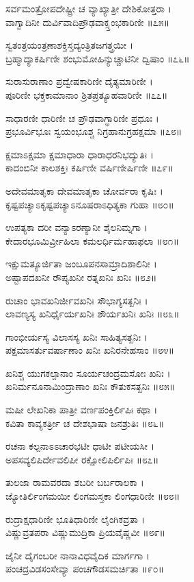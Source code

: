 ಸರ್ವಮಂತ್ರೋಪದೇಷ್ಟ್ರೀ ಚ ವ್ಯಾಖ್ಯಾತ್ರೀ ದೇಶಿಕೋತ್ತರಾ ।\\
ವಾಗ್ವಾದಿನೀ ದುರ್ವಿವಾದಿಪ್ರೌಢವಾಕ್ಸ್ತಂಭಕಾರಿಣೀ ॥೭೫॥

ಸ್ವತಂತ್ರಯಂತ್ರಣಾಶಕ್ತಿಸ್ತದ್ಯಂತ್ರಿತಜಗತ್ತ್ರಯೀ ।\\
ಬ್ರಹ್ಮಾದ್ಯಾಕರ್ಷಿಣೀ ಶಂಭುಮೋಹಿನ್ಯುಚ್ಚಾಟಿನೀ ದ್ವಿಷಾಂ ॥೭೬॥

ಸುರಾಸುರಾಣಾಂ ಪ್ರದ್ವೇಷಕಾರಿಣೀ ದೈತ್ಯಮಾರಿಣೀ ।\\
ಪೂರಿಣೀ ಭಕ್ತಕಾಮಾನಾಂ ಶ್ರಿತಪ್ರತ್ಯೂಹವಾರಿಣೀ ॥೭೭॥

ಸಾಧಾರಣೀ ಧಾರಿಣೀ ಚ ಪ್ರೌಢವಾಗ್ಧಾರಿಣೀ ಪ್ರಧೂಃ ।\\
ಪ್ರಭೂರ್ವಿಭೂಃ ಸ್ವಯಂಭೂಶ್ಚ ನಿಗ್ರಹಾನುಗ್ರಹಕ್ಷಮಾ ॥೭೮॥

ಕ್ಷಮಾಽಕ್ಷಮಾ ಕ್ಷಮಾಧಾರಾ ಧಾರಾಧರನಿಭದ್ಯುತಿಃ ।\\
ಕಾದಂಬಿನೀ ಕಾಲಶಕ್ತಿಃ ಕರ್ಷಿಣೀ ವರ್ಷಿಣೀರ್ಷಿಣೀ ॥೭೯॥

ಅದೇವಮಾತೃಕಾ ದೇವಮಾತೃಕಾ ಚೋರ್ವರಾ ಕೃಷಿಃ ।\\
ಕೃಷ್ಟಪಚ್ಯಾಽಕೃಷ್ಟಪಚ್ಯಾಽನೂಷರಾಽಧಿತ್ಯಕಾ ಗುಹಾ ॥೮೦॥

ಉಪತ್ಯಕಾ ದರೀ ವನ್ಯಾಽರಣ್ಯಾನೀ ಶೈಲನಿಮ್ನಗಾ ।\\
ಕೇದಾರಭೂಮಿರ್ವ್ರೀಹಿಲಾ ಕಮಲರ್ಧಿರ್ಮಹಾಫಲಾ ॥೮೧॥

ಇಕ್ಷುಮತ್ಯೂರ್ಜಿತಾ ಜಂಬೂಪನಸಾಮ್ರಾದಿಶಾಲಿನೀ ।\\
ಅಷ್ಟಾಪದಖನೀ ರೌಪ್ಯಖನೀ ರತ್ನಖನಿಃ ಖನಿಃ ॥೮೨॥

ರುಚಾಂ ಭಾವಖನಿರ್ಜೀವಖನಿಃ ಸೌಭಾಗ್ಯಸತ್ಖನಿಃ ।\\
ಲಾವಣ್ಯಸ್ಯ ಖನಿರ್ಧೈರ್ಯಖನಿಃ ಶೌರ್ಯಖನಿಃ ಖನಿಃ ॥೮೩॥

ಗಾಂಭೀರ್ಯಸ್ಯ ವಿಲಾಸಸ್ಯ ಖನಿಃ ಸಾಹಿತ್ಯಸತ್ಖನಿಃ ।\\
ಪಕ್ಷಮಾಸರ್ತುವರ್ಷಾಣಾಂ ಖನಿಃ ಖನಿರನೇಹಸಾಂ ॥೮೪॥

ಖನಿಶ್ಚ ಯುಗಕಲ್ಪಾನಾಂ ಸೂರ್ಯಚಂದ್ರಮಸೋಃ ಖನಿಃ ।\\
ಖನಿರ್ಮನೂನಾಮಿಂದ್ರಾಣಾಂ ಖನಿಃ ಕೌತುಕಸತ್ಖನಿಃ ॥೮೫॥

ಮಷೀ ಲೇಖನಿಕಾ ಪಾತ್ರೀ ವರ್ಣಪಂಕ್ತಿರ್ಲಿಪಿಃ ಕಥಾ ।\\
ಕವಿತಾ ಕಾವ್ಯಕರ್ತ್ರೀ ಚ ದೇಶಭಾಷಾ ಜನಶ್ರುತಿಃ ॥೮೬॥

ರಚನಾ ಕಲ್ಪನಾಽಽಚಾರಭಟೀ ಧಾಟೀ ಪಟೀಯಸೀ ।\\
ಅಪಸವ್ಯಲಿಪಿರ್ದೇವಲಿಪೀ ರಕ್ಷೋಲಿಪಿರ್ಲಿಪಿಃ ॥೮೭॥

ತುಲಜಾ ರಾಮವರದಾ ಶಬರೀ ಬರ್ಬರಾಲಕಾ ।\\
ಜ್ಯೋತಿರ್ಲಿಂಗಮಯೀ ಲಿಂಗಮಸ್ತಕಾ ಲಿಂಗಧಾರಿಣೀ ॥೮೮॥

ರುದ್ರಾಕ್ಷಧಾರಿಣೀ ಭೂತಿಧಾರಿಣೀ ಲೈಂಗಿಕವ್ರತಾ ।\\
ವಿಷ್ಣುವ್ರತಪರಾ ವಿಷ್ಣುಮುದ್ರಿಕಾ ಪ್ರಿಯವೈಷ್ಣವೀ ॥೮೯॥

ಜೈನೀ ದೈಗಂಬರೀ ನಾನಾವಿಧವೈದಿಕ ಮಾರ್ಗಗಾ ।\\
ಪಂಚದ್ರವಿಡಸಂಸೇವ್ಯಾ ಪಂಚಗೌಡಸಮರ್ಚಿತಾ ॥೯೦॥


